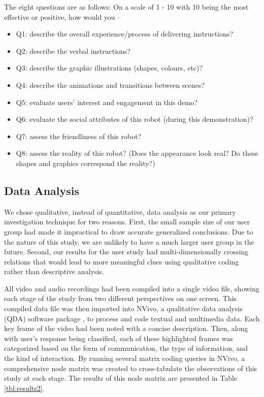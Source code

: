 \documentclass[letterpaper, 10 pt, conference]{ieeeconf}  %
\begin{document}
The eight questions are as follows: On a scale of 1 - 10 with 10 being the most effective or positive, how would you --
\begin{itemize}
\item Q1: describe the overall experience/process of delivering instructions?
\item Q2: describe the verbal instructions?
\item Q3: describe the graphic illustrations (shapes, colours, etc)?
\item Q4: describe the animations and transitions between scenes?
\item Q5: evaluate users' interest and engagement in this demo?
\item Q6: evaluate the social attributes of this robot (during this demonstration)? 
\item Q7: assess the friendliness of this robot?
\item Q8: assess the reality of this robot? (Does the appearance look real? Do these shapes and graphics correspond the reality?)
\end{itemize}


\subsection{Data Analysis}

We chose qualitative, instead of quantitative, data analysis as our primary investigation technique for two reasons. First, the small sample size of our user group had made it impractical to draw accurate generalized conclusions. Due to the nature of this study, we are unlikely to have a much larger user group in the future. Second, our results for the user study had multi-dimensionally crossing relations that would lead to more meaningful clues using qualitative coding rather than descriptive analysis.

All video and audio recordings had been compiled into a single video file, showing each stage of the study from two different perspectives on one screen. This compiled data file was then imported into NVivo, a qualitative data analysis (QDA) software package \cite{nvivo}, to process and code textual and multimedia data. Each key frame of the video had been noted with a concise description. Then, along with user's response being classified, each of these highlighted frames was categorized based on the form of communication, the type of information, and the kind of interaction. By running several matrix coding queries in NVivo, a comprehensive node matrix was created to cross-tabulate the observations of this study at each stage. The results of this node matrix are presented in Table \ref{tbl:results2}.
\end{document}
